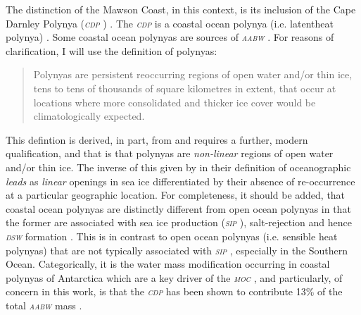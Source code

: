 \documentclass[11pt,a4paper]{article}
\newcommand{\moc}{\textit{\textsc{moc }}} %
\newcommand{\sip}{\textit{\textsc{sip }}} %
\newcommand{\dsw}{\textit{\textsc{{dsw }}}} %
\newcommand{\aabw}{\textit{\textsc{{aabw }}}} %
\newcommand{\cdp}{\textit{\textsc{{cdp }}}} %
\begin{document}
The distinction of the Mawson Coast, in this context, is its inclusion of the Cape Darnley Polynya
(\cdp) \citep{meijersCirculationWaterMasses2010}. The \cdp is a coastal ocean polynya
(i.e. latent\textendash heat polynya) \citep{massomDistributionFormativeProcesses1998,tamuraMappingSeaIce2008}. Some coastal ocean
polynyas are sources of \aabw \citep{massomDistributionFormativeProcesses1998,maquedam.PolynyaDynamicsReview}. For
reasons of clarification, I will use the \cite{barberChapterRoleSea2007} definition of
polynyas:
\begin{quote}
  Polynyas are persistent reoccurring regions of open water and/or thin ice,
  tens to tens of thousands of square kilometres in extent, that occur at
  locations where more consolidated and thicker ice cover would be
  climatologically expected.
\end{quote}

This defintion is derived, in part, from \cite{smithPolynyasLeadsOverview1990} and requires a
further, modern qualification, and that is that polynyas are \textit{non-linear}
regions \citep{massomDistributionFormativeProcesses1998} of open water and/or thin ice. The inverse of this
given by \cite{smithPolynyasLeadsOverview1990} in their definition of oceanographic \textit{leads} as
\textit{linear} openings in sea ice differentiated by their absence of
re-occurrence at a particular geographic location. For completeness, it should
be added, that coastal ocean polynyas are distinctly different from open ocean
polynyas in that the former are associated with sea ice production (\sip),
salt-rejection and hence \dsw formation
\citep{massomDistributionFormativeProcesses1998,maquedam.PolynyaDynamicsReview,tamuraMappingSeaIce2008}. This is in contrast to open ocean
polynyas (i.e. sensible heat polynyas) that are not typically associated with
\sip, especially in the Southern Ocean. Categorically, it is the water mass
modification occurring in coastal polynyas of Antarctica which are a
key driver of the \moc \citep{gawarkiewiczNumericalStudyDense1995,orsiCirculationMixingProduction1999,galton-fenziModelingBasalMelting2012,sansivieroModellingSeaIce2017},
and particularly, of concern in this work, is that the \cdp has been
shown to contribute 13\% of the total \aabw mass \citep{ohshimaAntarcticBottomWater2013}.
\end{document}
